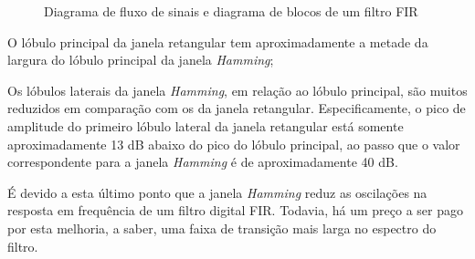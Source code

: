 		\begin{figure}[!htb]
			\centering
			\qquad
			\caption{Diagrama de fluxo de sinais e diagrama de blocos de um filtro FIR}
			\label{fig01}	
		\end{figure}
		
		O lóbulo principal da janela retangular tem aproximadamente a metade da largura do lóbulo principal da janela \textit{Hamming};
		
		Os lóbulos laterais da janela \textit{Hamming}, em relação ao lóbulo principal, são muitos reduzidos em comparação com os da janela retangular. Especificamente, o pico de amplitude do primeiro lóbulo lateral da janela retangular está somente aproximadamente 13 dB abaixo do pico do lóbulo principal, ao passo que o valor correspondente para a janela \textit{Hamming} é de aproximadamente 40 dB.
		
		É devido a esta último ponto que a janela \textit{Hamming} reduz as oscilações na resposta em frequência de um filtro digital FIR. Todavia, há um preço a ser pago por esta melhoria, a saber, uma faixa de transição mais larga no espectro do filtro.\cite{haykin2001sinais}
	
